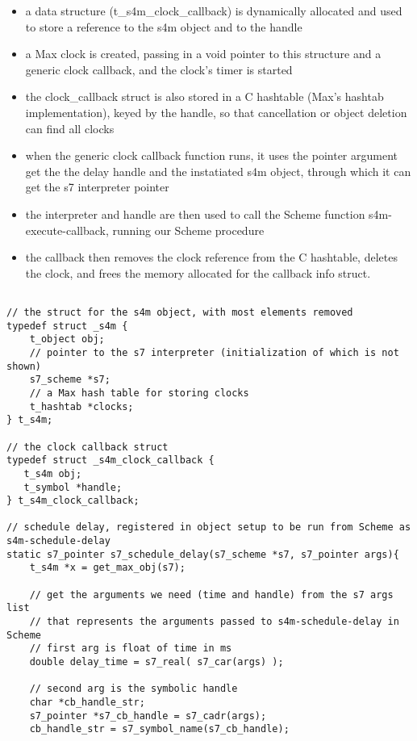 \documentclass[acmsmall]{acmart}
\begin{document}
{\begin{itemize}
\item a data structure (t\_s4m\_clock\_callback) is dynamically allocated and used to store a
reference to the s4m object and to the handle
\item a Max clock is created, passing in a void pointer to this structure
  and a generic clock callback, and the clock's timer is started
\item the clock\_callback struct is also stored in a C hashtable (Max's hashtab implementation),
  keyed by the handle, so that cancellation or object deletion can find all clocks
\item when the generic clock callback function runs, it uses the pointer argument get the
  the delay handle and the instatiated s4m object, through which it 
  can get the s7 interpreter pointer 
\item the interpreter and handle are then used to call the Scheme function
  s4m-execute-callback, running our Scheme procedure
\item the callback then removes the clock reference from the C hashtable,
  deletes the clock, and frees the memory allocated for the callback info struct.
\end{itemize}


\begin{verbatim}

// the struct for the s4m object, with most elements removed
typedef struct _s4m {
    t_object obj;
    // pointer to the s7 interpreter (initialization of which is not shown)
    s7_scheme *s7;
    // a Max hash table for storing clocks
    t_hashtab *clocks;     
} t_s4m;

// the clock callback struct
typedef struct _s4m_clock_callback {
   t_s4m obj;
   t_symbol *handle; 
} t_s4m_clock_callback;

// schedule delay, registered in object setup to be run from Scheme as s4m-schedule-delay
static s7_pointer s7_schedule_delay(s7_scheme *s7, s7_pointer args){
    t_s4m *x = get_max_obj(s7);

    // get the arguments we need (time and handle) from the s7 args list
    // that represents the arguments passed to s4m-schedule-delay in Scheme
    // first arg is float of time in ms 
    double delay_time = s7_real( s7_car(args) );

    // second arg is the symbolic handle
    char *cb_handle_str;
    s7_pointer *s7_cb_handle = s7_cadr(args);
    cb_handle_str = s7_symbol_name(s7_cb_handle);


\end{verbatim}}
\end{document}
